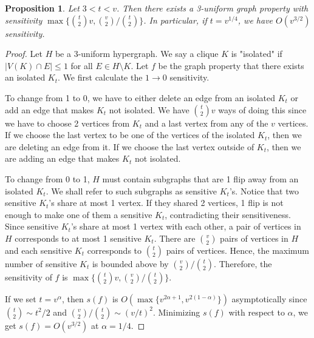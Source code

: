 \documentclass[psamsfonts]{amsart}
\newtheorem{prop}[theorem]{Proposition}
\theoremstyle{definition}
\theoremstyle{remark}
\numberwithin{equation}{section}
\begin{document}
	\begin{prop} Let $3 < t < v$. Then there exists a 3-uniform graph property with sensitivity $\max \{ {t \choose 2}v, {v \choose 2}/{t \choose 2}\}$. In particular, if $t = v^{1/4}$, we have $O(v^{3/2})$ sensitivity.
	\end{prop}

\begin{proof}
Let $H$ be a 3-uniform hypergraph. We say a clique $K$ is "isolated" if $|V(K) \cap E| \leq 1$ for all $E \in H\setminus K$. Let $f$ be the graph property that there exists an isolated $K_t$. We first calculate the $1 \rightarrow 0$ sensitivity.

To change from 1 to 0, we have to either delete an edge from an isolated $K_t$ or add an edge that makes $K_t$ not isolated. We have ${t \choose 2}v$ ways of doing this since we have to choose 2 vertices from $K_t$ and a last vertex from any of the $v$ vertices. If we choose the last vertex to be one of the vertices of the isolated $K_t$, then we are deleting an edge from it. If we choose the last vertex outside of $K_t$, then we are adding an edge that makes $K_t$ not isolated.

To change from 0 to 1, $H$ must contain subgraphs that are 1 flip away from an isolated $K_t$. We shall refer to such subgraphs as sensitive $K_t$'s. Notice that two sensitive $K_t$'s share at most 1 vertex. If they shared 2 vertices, 1 flip is not enough to make one of them a sensitive $K_t$, contradicting their sensitiveness. Since sensitive $K_t$'s share at most 1 vertex with each other, a pair of vertices in $H$ corresponds to at most 1 sensitive $K_t$. There are ${v \choose 2}$ pairs of vertices in $H$ and each sensitive $K_t$ corresponds to ${t \choose 2}$ pairs of vertices. Hence, the maximum number of sensitive $K_t$ is bounded above by ${v \choose 2}/{t \choose 2}$. Therefore, the sensitivity of $f$ is $\max \{ {t \choose 2}v, {v \choose 2}/{t \choose 2}\}$.


If we set $t = v^\alpha$, then $s(f)$ is $O(\max \{ v^{2\alpha + 1}, v^{2(1-\alpha)}\})$ asymptotically since ${t \choose 2} \sim t^2/2$ and ${v \choose 2}/{t \choose 2} \sim (v/t)^2$. Minimizing $s(f)$ with respect to $\alpha$, we get $s(f) = O(v^{3/2})$ at $\alpha = 1/4$.
\end{proof}
	
\end{document}
